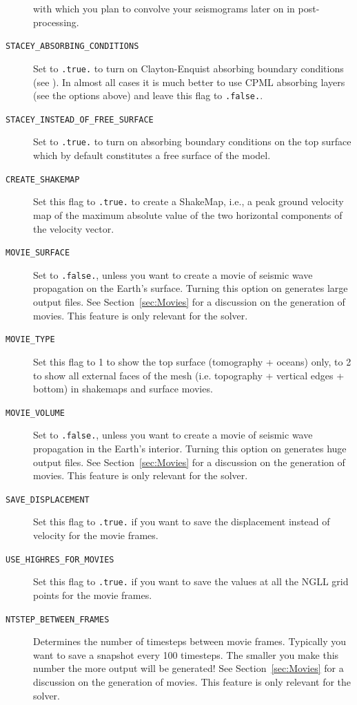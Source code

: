 \begin{description}
with which you plan to convolve your seismograms later on in post-processing.
\item [{\texttt{STACEY\_ABSORBING\_CONDITIONS}}] Set to \texttt{.true.}
to turn on Clayton-Enquist absorbing boundary conditions (see \citet{KoTr99}).
In almost all cases it is much better to use CPML absorbing layers
(see the options above) and leave this flag to \texttt{.false.}.
\item [{\texttt{STACEY\_INSTEAD\_OF\_FREE\_SURFACE}}] Set to \texttt{.true.}
to turn on absorbing boundary conditions on the top surface which
by default constitutes a free surface of the model.
\item [{\texttt{CREATE\_SHAKEMAP}}] Set this flag to \texttt{.true.} to
create a ShakeMap\textregistered{}, i.e., a peak ground velocity map
of the maximum absolute value of the two horizontal components of
the velocity vector.
\item [{\texttt{MOVIE\_SURFACE}}] Set to \texttt{.false.}, unless you want
to create a movie of seismic wave propagation on the Earth's surface.
Turning this option on generates large output files. See Section~\ref{sec:Movies}
for a discussion on the generation of movies. This feature is only
relevant for the solver.
\item [{\texttt{MOVIE\_TYPE}}] Set this flag to 1 to show the top surface
(tomography + oceans) only, to 2 to show all external faces of the
mesh (i.e. topography + vertical edges + bottom) in shakemaps and
surface movies.
\item [{\texttt{MOVIE\_VOLUME}}] Set to \texttt{.false.}, unless you want
to create a movie of seismic wave propagation in the Earth's interior.
Turning this option on generates huge output files. See Section~\ref{sec:Movies}
for a discussion on the generation of movies. This feature is only
relevant for the solver.
\item [{\texttt{SAVE\_DISPLACEMENT}}] Set this flag to \texttt{.true.}
if you want to save the displacement instead of velocity for the movie
frames.
\item [{\texttt{USE\_HIGHRES\_FOR\_MOVIES}}] Set this flag to \texttt{.true.}
if you want to save the values at all the NGLL grid points for the
movie frames.
\item [{\texttt{NTSTEP\_BETWEEN\_FRAMES}}] Determines the number of timesteps
between movie frames. Typically you want to save a snapshot every
100 timesteps. The smaller you make this number the more output will
be generated! See Section~\ref{sec:Movies} for a discussion on the
generation of movies. This feature is only relevant for the solver.

\end{description}

